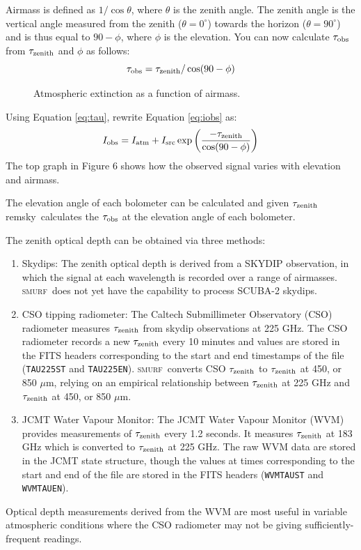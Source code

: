 \documentclass[twoside,11pt]{article}
\newcommand{\xref}[3]{#1}
\renewcommand{\_}{\texttt{\symbol{95}}}
\newcommand{\SMURF}{\textsc{smurf}}
\newcommand{\task}[1]{\textsf{#1}}
\newcommand{\remsky}{\xref{\task{remsky}}{sun258}{REMSKY}}
\begin{document}
Airmass is defined as $1 / \cos \theta$, where $\theta$ is the zenith
angle. The zenith angle is the vertical angle measured from the zenith
($\theta = 0^\circ$) towards the horizon ($\theta = 90^\circ$) and is
thus equal to $90-\phi$, where $\phi$ is the elevation. You can now
calculate $\tau_{\rm obs}$ from $\tau_{\rm zenith}$ and $\phi$ as
follows:
\begin{equation}
\tau_{\rm obs} = \tau_{\rm zenith} / \cos(90 - \phi )
\label{eq:tau}
\end{equation}

\begin{figure}
\caption{Atmospheric extinction as a function of airmass.}
\end{figure}

Using Equation \ref{eq:tau}, rewrite Equation \ref{eq:iobs} as:
\begin{equation}
I_{\rm obs} = I_{\rm atm} + I_{\rm src} \exp \left( 
\frac{-\tau_{\rm zenith}}{\cos(90-\phi)}\right)
\end{equation}
The top graph in Figure 6 shows how the observed signal varies with elevation
and airmass.

The elevation angle of each bolometer can be calculated and given
$\tau_{\rm zenith}$ \remsky\ calculates the $\tau_{\rm obs}$ at the
elevation angle of each bolometer. 

The zenith optical depth can be obtained via three methods:
\begin{enumerate}
\item Skydips: The zenith optical depth is derived from a SKYDIP
  observation, in which the signal at each wavelength is recorded over
  a range of airmasses. \SMURF\ does not yet have the capability to
  process SCUBA-2 skydips.

\item CSO tipping radiometer: The Caltech Submillimeter Observatory
  (CSO) radiometer measures $\tau_{\rm zenith}$ from skydip
  observations at 225 GHz. The CSO radiometer records a new $\tau_{\rm
    zenith}$ every 10 minutes and values are stored in the FITS
  headers corresponding to the start and end timestamps of the file
  (\texttt{TAU225ST} and \texttt{TAU225EN}). \SMURF\ converts CSO
  $\tau_{\rm zenith}$ to $\tau_{\rm zenith}$ at 450, or 850 $\mu$m,
  relying on an empirical relationship between $\tau_{\rm zenith}$ at
  225 GHz and $\tau_{\rm zenith}$ at 450, or 850 $\mu$m.

\item JCMT Water Vapour Monitor: The JCMT Water Vapour Monitor (WVM)
  provides measurements of $\tau_{\rm zenith}$ every 1.2 seconds. It
  measures $\tau_{\rm zenith}$ at 183 GHz which is converted to
  $\tau_{\rm zenith}$ at 225 GHz. The raw WVM data are stored in the
  JCMT state structure, though the values at times corresponding to
  the start and end of the file are stored in the FITS headers
  (\texttt{WVMTAUST} and \texttt{WVMTAUEN}).
\end{enumerate}
Optical depth measurements derived from the WVM are most useful in
variable atmospheric conditions where the CSO radiometer may not be
giving sufficiently-frequent readings.
\end{document}
